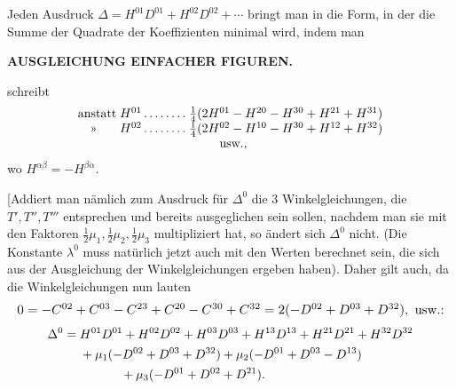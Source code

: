 Jeden Ausdruck \(\Delta=H^{01}D^{01}+H^{02}D^{02}+\cdots\) bringt man in die Form, in der die Summe der Quadrate der Koeffizienten minimal wird, indem man

\par\clearpage
\noindent\null\hfill{\small\textbf{AUSGLEICHUNG EINFACHER FIGUREN.}}\hfill{}\par\medskip

\noindent schreibt
\[
\begin{array}{@{}l@{\;}l@{\;}l@{}}
 \text{anstatt}&
 H^{01}\,.\,.\,.\,.\,.\,.\,.\,.&
 \tfrac14(2H^{01}-H^{20}-H^{30}+H^{21}+H^{31})\\
 \text{\quad»}&
 H^{02}\,.\,.\,.\,.\,.\,.\,.\,.&
 \tfrac14(2H^{02}-H^{10}-H^{30}+H^{12}+H^{32})\\
 \multicolumn{3}{c@{}}{\text{usw.,}}
\end{array}
\]
\noindent wo \(H^{\alpha\beta}=-H^{\beta\alpha}\).

[Addiert man nämlich zum Ausdruck für \(\Delta^0\) die 3 Winkelgleichungen, die \(T',T'',T'''\) entsprechen und bereits ausgeglichen sein sollen, nachdem man sie mit den Faktoren \(\tfrac12\mu_1,\tfrac12\mu_2,\tfrac12\mu_3\) multipliziert hat, so ändert sich \(\Delta^0\) nicht. (Die Konstante \(\lambda^0\) muss natürlich jetzt auch mit den Werten berechnet sein, die sich aus der Ausgleichung der Winkelgleichungen ergeben haben). Daher gilt auch, da die Winkelgleichungen nun lauten
\[
 \resizebox{\linewidth}{!}{\(0=-C^{02}+C^{03}-C^{23}+C^{20}-C^{30}+C^{32}
 =2(-D^{02}+D^{03}+D^{32}),\ \text{usw.:}\)}
\]
\[
\begin{aligned}
 \Delta^0={}&H^{01}D^{01}+H^{02}D^{02}+H^{03}D^{03}
             +H^{13}D^{13}+H^{21}D^{21}+H^{32}D^{32}\\
 &+\mu_1(-D^{02}+D^{03}+D^{32})+\mu_2(-D^{01}+D^{03}-D^{13})\\
 &\hspace{3.3em}+\mu_3(-D^{01}+D^{02}+D^{21}).
\end{aligned}
\]

